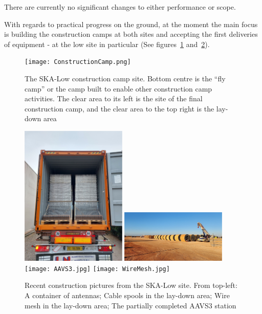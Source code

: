 \documentclass[a4paper,
               biblatex,     %
               keeplastbox,   %
               ]{jacow}
\begin{document}
There are currently no significant changes to either performance or scope.

With regards to practical progress on the ground, at the moment the main focus is building the construction camps at both sites and accepting the first deliveries of equipment - at the low site in particular (See figures~\ref{fig:low-camp} and~\ref{fig:low-construction}).

\begin{figure}[tb]
	\centering
  \texttt{[image: ConstructionCamp.png]}    
	\caption{The SKA-Low construction camp site. Bottom centre is the ``fly camp'' or the camp built to enable other construction camp activities. The clear area to its left is the site of the final construction camp, and the clear area to the top right is the lay-down area}
	\label{fig:low-camp}
\end{figure}


\begin{figure}[tb]
	\centering
  \includegraphics[width=0.45\textwidth]{Packed Antennas.jpg}
  \includegraphics[width=0.45\textwidth]{Cables.jpg}\\
  \texttt{[image: AAVS3.jpg]}
  \texttt{[image: WireMesh.jpg]}
    
	\caption{Recent construction pictures from the SKA-Low site. From top-left: A container of antennas; Cable spools in the lay-down area; Wire mesh in the lay-down area; The partially completed AAVS3 station
	}
	\label{fig:low-construction}
  \end{figure}
\end{document}
